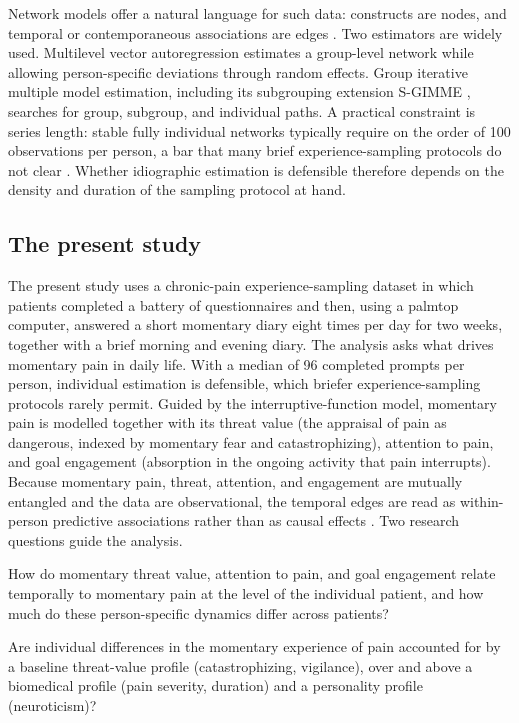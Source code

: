\documentclass[11pt,a4paper]{article}
\begin{document}
Network models offer a natural language for such data: constructs are nodes, and temporal or
contemporaneous associations are edges \citep{borsboom2013network,bringmann2013network}. Two
estimators are widely used. Multilevel vector autoregression
\citep[mlVAR;][]{bringmann2013network,epskamp2018gaussian} estimates a group-level network while
allowing person-specific deviations through random effects. Group iterative multiple model
estimation, including its subgrouping extension S-GIMME
\citep{gates2012group,lane2019uncovering}, searches for group, subgroup, and individual paths. A
practical constraint is series length: stable fully individual networks typically require on the
order of 100 observations per person, a bar that many brief experience-sampling protocols do not
clear \citep{beltz2016bridging}. Whether idiographic estimation is defensible therefore depends on
the density and duration of the sampling protocol at hand.

\subsection{The present study}
The present study uses a chronic-pain experience-sampling dataset in which patients completed a
battery of questionnaires and then, using a palmtop computer, answered a short momentary diary
eight times per day for two weeks, together with a brief morning and evening diary. The analysis
asks what drives momentary pain in daily life. With a median of 96 completed prompts per person,
individual estimation is defensible, which briefer experience-sampling protocols rarely permit.
Guided by the interruptive-function model, momentary pain is modelled together with its threat
value (the appraisal of pain as dangerous,
indexed by momentary fear and catastrophizing), attention to pain, and goal engagement
(absorption in the ongoing activity that pain interrupts). Because momentary pain, threat,
attention, and engagement are mutually entangled and the data are observational, the temporal
edges are read as within-person predictive associations rather than as causal effects
\citep{rohrer2018thinking}. Two research questions guide the analysis.

\begin{description}[leftmargin=2.2em,itemsep=2pt]
  \item[\textbf{RQ1.}] How do momentary threat value, attention to pain, and goal engagement
  relate temporally to momentary pain at the level of the individual patient, and how much do
  these person-specific dynamics differ across patients?
  \item[\textbf{RQ2.}] Are individual differences in the momentary experience of pain accounted
  for by a baseline threat-value profile (catastrophizing, vigilance), over and above a
  biomedical profile (pain severity, duration) and a personality profile (neuroticism)?
\end{description}
\end{document}
